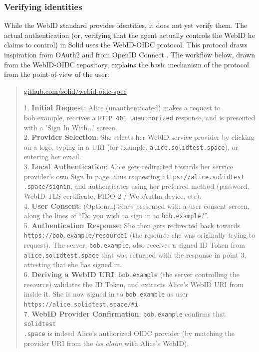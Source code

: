 \subsubsection{Verifying identities}
While the WebID standard provides identities, it does not yet verify them. The actual authentication (or, verifying that the agent actually controls the WebID he claims to control) in Solid uses the WebID-OIDC protocol. This protocol draws inspiration from OAuth2 \citep{oauth2} and from OpenID Connect \citep{openid-connect}. The workflow below, drawn from the WebID-OIDC repository, explains the basic mechanism of the protocol from the point-of-view of the user:

\begin{quote}{\href{https://github.com/solid/webid-oidc-spec}{github.com/solid/webid-oidc-spec}}

    1. \textbf{Initial Request}: Alice (unauthenticated) makes a request to bob.example, receives a \texttt{HTTP 401 Unauthorized} response, and is presented with a 'Sign In With...' screen.\\
    
    2. \textbf{Provider Selection}: She selects her WebID service provider by clicking on a logo, typing in a URI (for example, \texttt{alice.solidtest.space}), or entering her email.\\
    
    3. \textbf{Local Authentication}: Alice gets redirected towards her service provider's own Sign In page, thus requesting \texttt{https://alice.solidtest\\.space/signin}, and authenticates using her preferred method (password, WebID-TLS certificate, FIDO 2 / WebAuthn device, etc).\\
    
    4. \textbf{User Consent}: (Optional) She's presented with a user consent screen, along the lines of ``Do you wish to sign in to \texttt{bob.example}?''.\\
    
    5. \textbf{Authentication Response}: She then gets redirected back towards \texttt{https://bob.example/resource1} (the resource she was originally trying to request). The server, \texttt{bob.example}, also receives a signed ID Token from \texttt{alice.solidtest.space} that was returned with the response in point 3, attesting that she has signed in.\\
    
    6. \textbf{Deriving a WebID URI}: \texttt{bob.example} (the server controlling the resource) validates the ID Token, and extracts Alice's WebID URI from inside it. She is now signed in to \texttt{bob.example} as user\\ \texttt{https://alice.solidtest.space/\#i}.\\
    
    7. \textbf{WebID Provider Confirmation}: \texttt{bob.example} confirms that \texttt{solidtest\\.space} is indeed Alice's authorized OIDC provider (by matching the provider URI from the \textit{iss claim} with Alice's WebID).
\end{quote}

